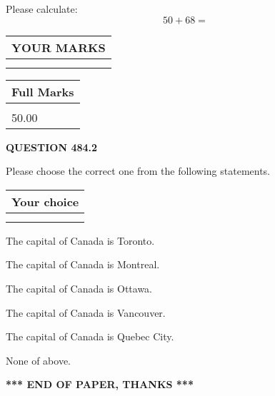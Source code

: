 \documentclass[12pt]{article}
\begin{document}
  
 
Please calculate:
\begin{equation}
50 +  %
68 = \nonumber
\end{equation}
 

 

 
  
\vspace{0.2in}
  
\noindent\begin{tabular}{|l|}
\hline
 YOUR MARKS  \\
\hline
 \\ 
 \\ 
\hline
\end{tabular}
\hspace{0.05in} \begin{tabular}{|l|}
\hline
 Full Marks  \\
\hline
 \\ 
50.00 \\
\hline
\end{tabular}
{\textbf{\Large{QUESTION
484.2 
}}}
  
  
Please choose the correct one from the following statements.
  
  
\noindent\hspace{3.0in} \begin{tabular}{|l|}
\hline
Your choice \\
\hline
 \\ 
 \\ 
\hline
\end{tabular}
  
  
 
 
The capital of Canada is Toronto.
 
 
The capital of Canada is Montreal.
 
 
The capital of Canada is Ottawa.
 
 
The capital of Canada is Vancouver.
 
 
The capital of Canada is Quebec City.
 
 
 None of above.
 
 
   
   
 \vspace{0.2in}
 
   
   
   
   
\vspace{1.0in} 
{\textbf{\large{ *** END OF PAPER, THANKS *** }}} 
   
\end{document}
